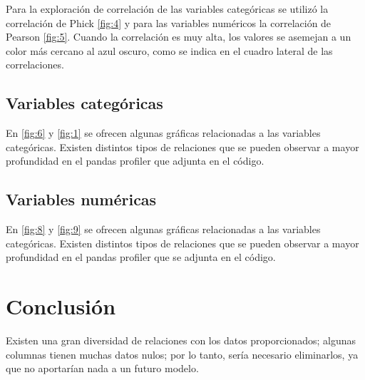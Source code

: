 Para la exploración de correlación de las variables categóricas se utilizó la correlación de Phick \ref{fig:4} y para las variables numéricos la correlación de Pearson \ref{fig:5}. Cuando la correlación es muy alta, los valores se asemejan a un color más cercano al azul oscuro, como se indica en el cuadro lateral de las correlaciones. 


\subsection{Variables categóricas}

En \ref{fig:6} y \ref{fig:1} se ofrecen algunas gráficas relacionadas a las variables categóricas. Existen distintos tipos de relaciones que se pueden observar a mayor profundidad en el pandas profiler que adjunta en el código. 

\subsection{Variables numéricas}
En \ref{fig:8} y \ref{fig:9} se ofrecen algunas gráficas relacionadas a las variables categóricas. Existen distintos tipos de relaciones que se pueden observar a mayor profundidad en el pandas profiler que se adjunta en el código. 



\section{Conclusión}

Existen una gran diversidad de relaciones con los datos proporcionados; algunas columnas tienen muchas datos nulos; por lo tanto, sería necesario eliminarlos, ya que no aportarían nada a un futuro modelo. 



%
%

